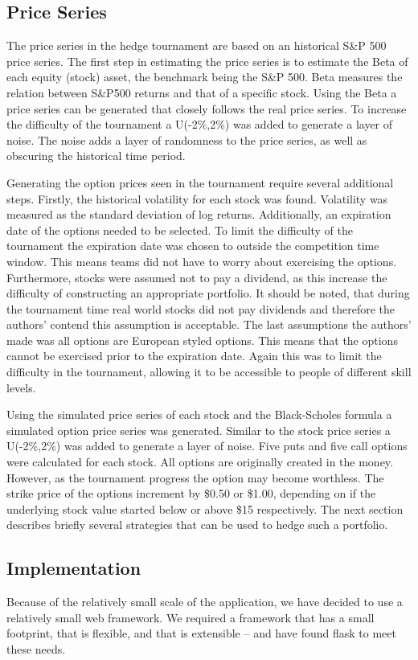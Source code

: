 \documentclass[conference, draftcls]{IEEEtran}
\begin{document}
\subsection{Price Series}
The price series in the hedge tournament are based on an historical S\&P 500 price series. The first step in estimating the price series is to estimate the Beta of each equity (stock) asset, the benchmark being the S\&P 500. Beta measures the relation between S\&P500 returns and that of a specific stock. Using the Beta a price series can be generated that closely follows the real price series. To increase the difficulty of the tournament a U(-2\%,2\%) was added to generate a layer of noise. The noise adds a layer of randomness to the price series, as well as obscuring the historical time period.

Generating the option prices seen in the tournament require several additional steps. Firstly, the historical volatility for each stock was found. Volatility was measured as the standard deviation of log returns.  Additionally, an expiration date of the options needed to be selected. To limit the difficulty of the tournament the expiration date was chosen to outside the competition time window. This means teams did not have to worry about exercising the options. Furthermore, stocks were assumed not to pay a dividend, as this increase the difficulty of constructing an appropriate portfolio. It should be noted, that during the tournament time real world stocks did not pay dividends and therefore the authors’ contend this assumption is acceptable. The last assumptions the authors’ made was all options are European styled options. This means that the options cannot be exercised prior to the expiration date. Again this was to limit the difficulty in the tournament, allowing it to be accessible to people of different skill levels.

Using the simulated price series of each stock and the Black-Scholes formula a simulated option price series was generated. Similar to the stock price series a U(-2\%,2\%) was added to generate a layer of noise. Five puts and five call options were calculated for each stock. All options are originally created in the money. However, as the tournament progress the option may become worthless. The strike price of the options increment by \$0.50 or \$1.00, depending on if the underlying stock value started below or above \$15 respectively. The next section describes briefly several strategies that can be used to hedge such a portfolio.

\subsection{Implementation}
Because of the relatively small scale of the application, we have decided to use a relatively small web framework. We required a framework that has a small footprint, that is flexible, and that is extensible -- and have found flask \cite{flask} to meet these needs. 
\end{document}
